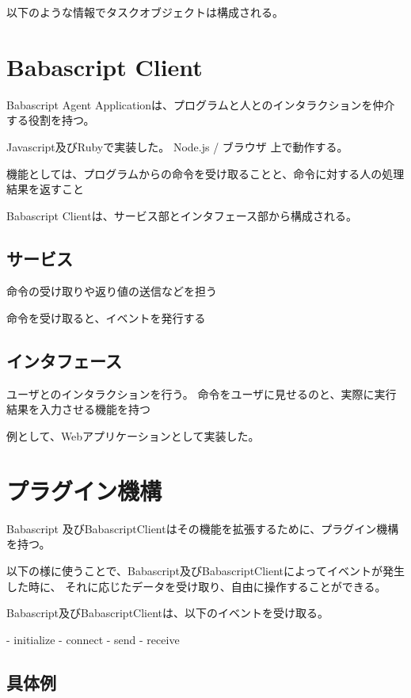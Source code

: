 以下のような情報でタスクオブジェクトは構成される。

\section{Babascript Client}

Babascript Agent Applicationは、プログラムと人とのインタラクションを仲介する役割を持つ。

Javascript及びRubyで実装した。
Node.js / ブラウザ 上で動作する。

機能としては、プログラムからの命令を受け取ることと、命令に対する人の処理結果を返すこと

Babascript Clientは、サービス部とインタフェース部から構成される。

\subsection{サービス}

命令の受け取りや返り値の送信などを担う

命令を受け取ると、イベントを発行する



\subsection{インタフェース}

ユーザとのインタラクションを行う。
命令をユーザに見せるのと、実際に実行結果を入力させる機能を持つ

例として、Webアプリケーションとして実装した。


\section{プラグイン機構}

Babascript 及びBabascriptClientはその機能を拡張するために、プラグイン機構を持つ。

以下の様に使うことで、Babascript及びBabascriptClientによってイベントが発生した時に、
それに応じたデータを受け取り、自由に操作することができる。

Babascript及びBabascriptClientは、以下のイベントを受け取る。

- initialize
- connect
- send
- receive

\subsection{具体例}



